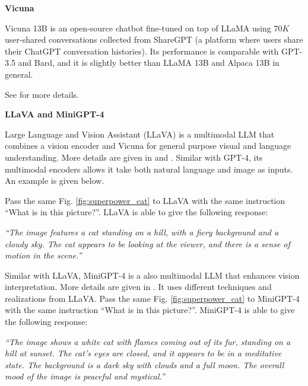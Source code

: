\vspace{0.1in}
\noindent \textbf{Vicuna}
\vspace{0.1in}

Vicuna 13B is an open-source chatbot fine-tuned on top of LLaMA using $70K$ user-shared conversations collected from ShareGPT (a platform where users share their ChatGPT conversation histories). Its performance is comparable with GPT-3.5 and Bard, and it is slightly better than LLaMA 13B and Alpaca 13B in general.

See \cite{vicuna2023} for more details.

\vspace{0.1in}
\noindent \textbf{LLaVA and MiniGPT-4}
\vspace{0.1in}

Large Language and Vision Assistant (LLaVA) is a multimodal LLM that combines a vision encoder and Vicuna for general purpose visual and language understanding. More details are given in \cite{liu2023llava} and \cite{liu2023improvedllava}. Similar with GPT-4, its multimodal encoders allows it take both natural language and image as inputs. An example is given below.

Pass the same Fig. \ref{fig:superpower_cat} to LLaVA with the same instruction ``What is in this picture?''. LLaVA is able to give the following response:

\vspace{0.1in}
\noindent \textit{``The image features a cat standing on a hill, with a fiery background and a cloudy sky. The cat appears to be looking at the viewer, and there is a sense of motion in the scene.''}
\vspace{0.1in}

Similar with LLaVA, MiniGPT-4 is a also multimodal LLM that enhances vision interpretation. More details are given in \cite{zhu2023minigpt}. It uses different techniques and realizations from LLaVA. Pass the same Fig. \ref{fig:superpower_cat} to MiniGPT-4 with the same instruction ``What is in this picture?''. MiniGPT-4 is able to give the following response:

\vspace{0.1in}
\noindent \textit{``The image shows a white cat with flames coming out of its fur, standing on a hill at sunset. The cat’s eyes are closed, and it appears to be in a meditative state. The background is a dark sky with clouds and a full moon. The overall mood of the image is peaceful and mystical.''}
\vspace{0.1in}

